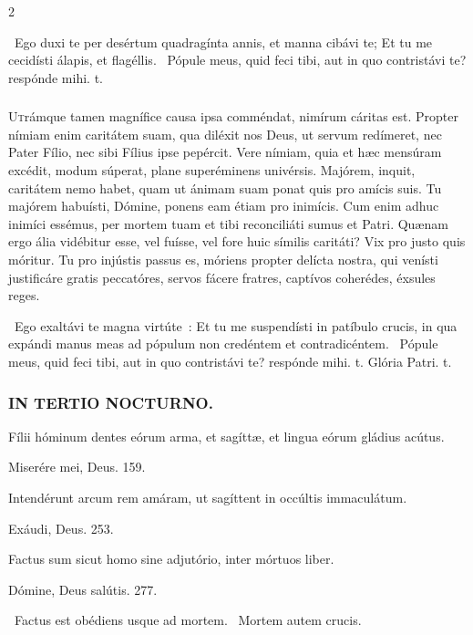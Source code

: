 \documentclass[9pt,twoside]{extarticle}
\begin{document}
\begin{multicols}{2}
{\begin{tightlist}{}
\item {}~Ego duxi te per desértum quadragínta annis, et manna cibávi te; \textred{*} Et tu me cecidísti álapis, et flagéllis. ~Pópule meus, quid feci tibi, aut in quo contristávi te? respónde mihi. t.
\end{tightlist}

\subsubsection*{\center {}}
\lettrine{U}trámque tamen magnífice causa ipsa comméndat, nimírum cáritas est. Propter nímiam enim caritátem suam, qua diléxit nos Deus, ut servum redímeret, nec Pater Fílio, nec sibi Fílius ipse pepércit. Vere nímiam, quia et hæc mensúram excédit, modum súperat, plane superéminens univérsis. Majórem, inquit, caritátem nemo habet, quam ut ánimam suam ponat quis pro amícis suis. Tu majórem habuísti, Dómine, ponens eam étiam pro inimícis. Cum enim adhuc inimíci essémus, per mortem tuam et tibi reconciliáti sumus et Patri. Quænam ergo ália vidébitur esse, vel fuísse, vel fore huic símilis caritáti? Vix pro justo quis móritur. Tu pro injústis passus es, móriens propter delícta nostra, qui venísti justificáre gratis peccatóres, servos fácere fratres, captívos coherédes, éxsules reges.

\begin{tightlist}{}
\item {}~Ego exaltávi te magna virtúte~: \textred{*} Et tu me suspendísti in patíbulo crucis, in qua expándi manus meas ad pópulum non credéntem et contradicéntem. ~Pópule meus, quid feci tibi, aut in quo contristávi te? respónde mihi. t. Glória Patri. t.
\end{tightlist}

\subsubsection*{\center \textsc{IN TERTIO NOCTURNO.}}
\begin{tightlist}{}
\item {} Fílii hóminum dentes eórum arma, et sagíttæ, et lingua eórum gládius acútus. 
\item {} Miserére mei, Deus. 159.
\item {} Intendérunt arcum rem amáram, ut sagíttent in occúltis immaculátum.
\item {} Exáudi, Deus. 253.
\item {} Factus sum sicut homo sine adjutório, inter mórtuos liber.
\item {} Dómine, Deus salútis. 277.
\item {}~Factus est obédiens usque ad mortem. ~Mortem autem crucis.
\end{tightlist}

}
\end{multicols}
\end{document}
